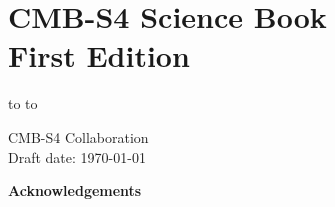 \documentclass[titlepage]{tcibook}
\begin{document}


\def\bibname{References}

%

\raggedbottom


\parindent=0pt
\parskip=8pt
\setlength{\evensidemargin}{0pt}
\setlength{\oddsidemargin}{0pt}
\setlength{\marginparsep}{0.0in}
\setlength{\marginparwidth}{0.0in}
\marginparpush=0pt


\renewcommand{\chapname}{chap:intro_}
\renewcommand{\chapterdir}{.}
\renewcommand{\arraystretch}{1.25}
\addtolength{\arraycolsep}{-3pt}

\chapter*{CMB-S4 Science Book\\ First Edition}
\vskip -9.5pt
\hbox to
\vskip-6.5pt
\hbox to

{\Large\bf
  \begin{center}
   CMB-S4 Collaboration\\
   \bigskip
   Draft date: \today
 \end{center}
}
\eject

\setcounter{page}{1}



\begin{center}
  {\Large \bf Acknowledgements}
\end{center}
  
\tableofcontents


\def\as#1{[{\bf AS:} {\it #1}] }


\end{document}
